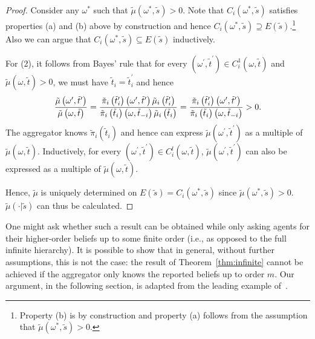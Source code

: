 \documentclass[12pt,reqno]{amsart}
\begin{document}
\begin{proof}
Consider any $\omega ^{\ast }$ such that $\tilde{\mu}\left( \omega ^{\ast },\tilde{s}%
\right) >0$. Note that $%
C_{i}\left( \omega ^{\ast },\tilde{s}\right) $ satisfies properties (a) and
(b) above by construction and hence $C_{i}\left( \omega ^{\ast },\tilde{s}%
\right) \supseteq E\left( \tilde{s}\right) $.\footnote{%
Property (b) is by construction and property (a) follows from the assumption
that $\tilde{\mu}\left( \omega ^{\ast },\tilde{s}\right) >0$.} Also we can
argue that $C_{i}\left( \omega^* ,\tilde{s}\right) \subseteq E\left( \tilde{s}%
\right) $ inductively.

For (2), it follows from Bayes' rule that for every $\left( \omega ^{\prime
},\tilde{t}^{\prime }\right) \in C_{i}^{1}\left( \omega ,\tilde{t}\right) $
and $\tilde{\mu}\left( \omega ,\tilde{t}\right) >0$, we must have $\tilde{t}%
_{i}=\tilde{t}_{i}^{\prime }$ and hence 
\[
\frac{\tilde{\mu}\left( \omega ^{\prime },\tilde{t}^{\prime }\right) }{%
\tilde{\mu}\left( \omega ,\tilde{t}\right) }=\frac{\tilde{\pi}_{i}\left( 
\tilde{t}_{i}^{\prime }\right) \left( \omega ^{\prime },\tilde{t}^{\prime
}\right) \tilde{\mu}_{i}\left( \tilde{t}_{i}^{\prime }\right) }{\tilde{\pi}%
_{i}\left( \tilde{t}_{i}\right) \left( \omega ,\tilde{t}_{-i}\right) \tilde{%
\mu}_{i}\left( \tilde{t}_{i}\right) }=\frac{\tilde{\pi}_{i}\left( \tilde{t}%
_{i}^{\prime }\right) \left( \omega ^{\prime },\tilde{t}^{\prime }\right) }{%
\tilde{\pi}_{i}\left( \tilde{t}_{i}\right) \left( \omega ,\tilde{t}%
_{-i}\right) }>0\text{.} 
\]%
The aggregator knows $\tilde{\pi}_{i}\left( \tilde{t}_{i}\right) $ and hence
can express $\tilde{\mu}\left( \omega ^{\prime },\tilde{t}^{\prime }\right) $
as a multiple of $\tilde{\mu}\left( \omega ,\tilde{t}\right) $. Inductively,
for every $\left( \omega ^{\prime },\tilde{t}^{\prime }\right) \in
C_{i}^{l}\left( \omega ,\tilde{t}\right) $, $\tilde{\mu}\left( \omega
^{\prime },\tilde{t}^{\prime }\right) $ can also be expressed as a multiple
of $\tilde{\mu}\left( \omega ,\tilde{t}\right) $. 

Hence, $\tilde{\mu}$ is uniquely determined on $E\left( \tilde{s}\right)=C_{i}\left( \omega^* ,\tilde{s}\right)$ since $\tilde{\mu}\left( \omega ^{\ast },\tilde{s}\right) >0$. $\tilde{\mu}(\cdot|\tilde{s})$ can thus be calculated.
\end{proof}

One might ask whether such a result can be obtained while only asking agents for their higher-order beliefs up to some finite order (i.e., as opposed to the full infinite hierarchy). It is possible to show that in general, without further assumptions, this is not the case: the result of Theorem~\ref{thm:infinite} cannot be achieved if the aggregator only knows the reported beliefs up to order $m$. Our argument, in the following section, is adapted from the leading example of~\cite{lipman2003finite}.
\end{document}
